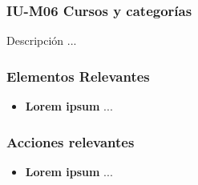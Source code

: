 
\subsubsection{IU-M06 Cursos y categorías}

 Descripción ...


\subsubsection{Elementos Relevantes}

    \begin{itemize}
    \item {\bf Lorem ipsum}
        ...
    \end{itemize}

\subsubsection{Acciones relevantes}

    \begin{itemize}
    \item {\bf Lorem ipsum}
        ...
    \end{itemize}

\clearpage
